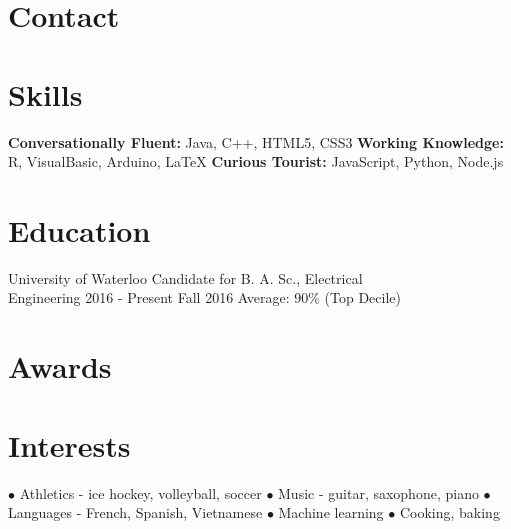 \documentclass[]{aanguyen_cv}
\begin{document}
	\begin{sidebar}%
		\vspace{35pt}%
		\section{Contact}
			\vspace{0.65cm}%
		\section{Skills}
			\textbf{Conversationally Fluent: }Java, C++, HTML5, CSS3
			\textbf{Working Knowledge: }R, VisualBasic, Arduino, \LaTeX
			\textbf{Curious Tourist: }JavaScript, Python, Node.js
			\vspace{0.65cm}%
		\section{Education}
			\eduentry%
				{University of Waterloo}%
				{Candidate for B. A. Sc., Electrical\\Engineering}%
				{2016 - Present}%
				{Fall 2016 Average: 90\% (Top Decile)}
			\vspace{0.65cm}%
		\section{Awards}
			\vspace{0.65cm}%
		\section{Interests}
		$\bullet$ Athletics - ice hockey, volleyball, soccer
		$\bullet$ Music - guitar, saxophone, piano
		$\bullet$ Languages - French, Spanish, Vietnamese
		$\bullet$ Machine learning
		$\bullet$ Cooking, baking
	\end{sidebar}%
\end{document}
